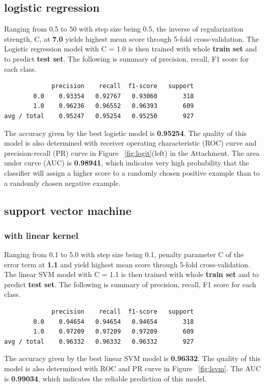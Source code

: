 \documentclass{article}
\begin{document}
\begin{singlespacing}
\subsection{logistic regression}
Ranging from 0.5 to 50 with step size being 0.5, the inverse of regularization strength, C, at \textbf{7.0} yields highest mean score through 5-fold cross-validation. The Logistic regression model with C = 1.0 is then trained with  whole \textbf{train set} and to predict \textbf{test set}. The following is summary of precision, recall, F1 score for each class.
\begin{lstlisting}
             precision    recall  f1-score   support
        0.0    0.93354   0.92767   0.93060       318
        1.0    0.96236   0.96552   0.96393       609
avg / total    0.95247   0.95254   0.95250       927
\end{lstlisting}
The accuracy given by the best logistic model is \textbf{0.95254}. The quality of this model is also determined with receiver operating characteristic (ROC) curve and precision-recall (PR) curve in Figure ~\ref{fig:logit}(left) in the Attachment. The area under curve (AUC) is \textbf{0.98941}, which indicates very high probability that the classifier will assign a higher score to a randomly chosen positive example than to a randomly chosen negative example.

\subsection{support vector machine}
\subsubsection{with linear kernel}
Ranging from 0.1 to 5.0 with step size being 0.1, penalty parameter C of the error term at \textbf{1.1} and yield highest mean score through 5-fold cross-validation. The linear SVM model with C = 1.1 is then trained with  whole \textbf{train set} and to predict \textbf{test set}. The following is summary of precision, recall, F1 score for each class.
\begin{lstlisting}
             precision    recall  f1-score   support
        0.0    0.94654   0.94654   0.94654       318
        1.0    0.97209   0.97209   0.97209       609
avg / total    0.96332   0.96332   0.96332       927
\end{lstlisting}
The accuracy given by the best linear SVM model is \textbf{0.96332}. The quality of this model is also determined with ROC and PR curve in Figure ~\ref{fig:lsvm}. The AUC is \textbf{0.99034}, which indicates the reliable prediction of this model.



\end{singlespacing}
\end{document}

